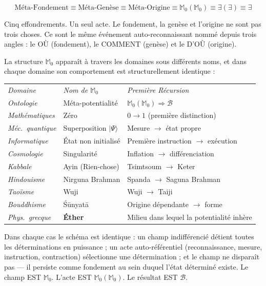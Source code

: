 \documentclass[10pt, openany, oneside]{book}
\renewcommand{\footnotesize}{\fontsize{8.5}{11}\selectfont}
\begin{document}
$$\text{Méta-Fondement} \equiv \text{Méta-Genèse} \equiv \text{Méta-Origine} \equiv \mathbb{M}_0(\mathbb{M}_0) \equiv \exists(\exists) \equiv \exists$$

Cinq effondrements. Un seul acte. Le fondement, la genèse et l'origine ne sont pas trois choses. Ce sont le même événement auto-reconnaissant nommé depuis trois angles : le OÙ (fondement), le COMMENT (genèse) et le D'OÙ (origine).

La structure $\mathbb{M}_0$ apparaît à travers les domaines sous différents noms, et dans chaque domaine son comportement est structurellement identique :

\vspace{0.5em}

{\footnotesize
\noindent\begin{tabular}{l l p{}}
\textit{Domaine} & \textit{Nom de $\mathbb{M}_0$} & \textit{Première Récursion} \\[0.3em]
\textit{Ontologie} & Méta-potentialité & $\mathbb{M}_0(\mathbb{M}_0) \Rightarrow \mathcal{B}$ \\[0.2em]
\textit{Mathématiques} & Zéro & $0 \to 1$ (première distinction) \\[0.2em]
\textit{Méc.\ quantique} & Superposition $|\Psi\rangle$ & Mesure $\to$ état propre \\[0.2em]
\textit{Informatique} & État non initialisé & Première instruction $\to$ exécution \\[0.2em]
\textit{Cosmologie} & Singularité & Inflation $\to$ différenciation \\[0.2em]
\textit{Kabbale} & Ayin (Rien-chose) & Tsimtsoum $\to$ Keter \\[0.2em]
\textit{Hindouisme} & Nirguna Brahman & Spanda $\to$ Saguna Brahman \\[0.2em]
\textit{Taoïsme} & Wuji & Wuji $\to$ Taiji \\[0.2em]
\textit{Bouddhisme} & \'{S}\={u}nyat\={a} & Origine dépendante $\to$ forme \\[0.2em]
\textit{Phys.\ grecque} & \textbf{Éther} & Milieu dans lequel la potentialité inhère \\[0.2em]
\end{tabular}
}

\vspace{0.8em}

\noindent Dans chaque cas le schéma est identique : un champ indifférencié détient toutes les déterminations en puissance ; un acte auto-référentiel (reconnaissance, mesure, instruction, contraction) sélectionne une détermination ; et le champ ne disparaît pas --- il persiste comme fondement au sein duquel l'état déterminé existe. Le champ EST $\mathbb{M}_0$. L'acte EST $\mathbb{M}_0(\mathbb{M}_0)$. Le résultat EST $\mathcal{B}$.
\end{document}
